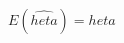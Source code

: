 \documentclass[preview]{standalone}
\begin{document}
\begin{center}
$E(\hat{	heta}) = 	heta$
\end{center}
\end{document}
